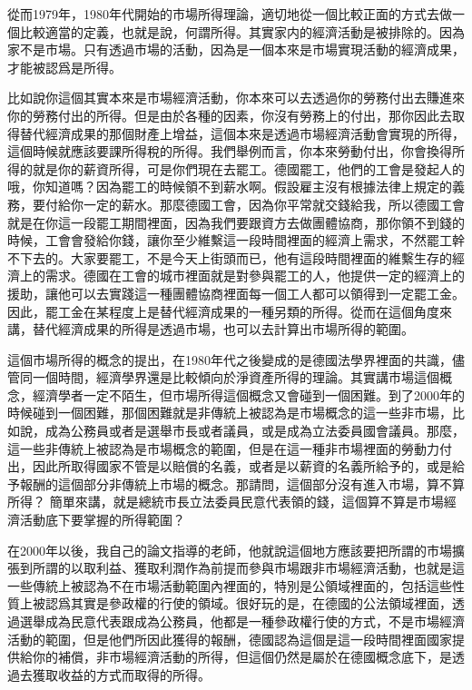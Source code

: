 \documentclass[oneside,sub3section]{ctexbook}
\begin{document}
從而1979年，1980年代開始的市場所得理論，適切地從一個比較正面的方式去做一個比較適當的定義，也就是說，何謂所得。其實家内的經濟活動是被排除的。因為家不是市場。只有透過市場的活動，因為是一個本來是市場實現活動的經濟成果，才能被認爲是所得。

比如說你這個其實本來是市場經濟活動，你本來可以去透過你的勞務付出去賺進來你的勞務付出的所得。但是由於各種的因素，你沒有勞務上的付出，那你因此去取得替代經濟成果的那個財產上增益，這個本來是透過市場經濟活動會實現的所得，這個時候就應該要課所得稅的所得。我們舉例而言，你本來勞動付出，你會換得所得的就是你的薪資所得，可是你們現在去罷工。德國罷工，他們的工會是發起人的哦，你知道嗎？因為罷工的時候領不到薪水啊。假設雇主沒有根據法律上規定的義務，要付給你一定的薪水。那麼德國工會，因為你平常就交錢給我，所以德國工會就是在你這一段罷工期間裡面，因為我們要跟資方去做團體協商，那你領不到錢的時候，工會會發給你錢，讓你至少維繫這一段時間裡面的經濟上需求，不然罷工幹不下去的。大家要罷工，不是今天上街頭而已，他有這段時間裡面的維繫生存的經濟上的需求。德國在工會的城市裡面就是對參與罷工的人，他提供一定的經濟上的援助，讓他可以去實踐這一種團體協商裡面每一個工人都可以領得到一定罷工金。因此，罷工金在某程度上是替代經濟成果的一種另類的所得。從而在這個角度來講，替代經濟成果的所得是透過市場，也可以去計算出市場所得的範圍。

這個市場所得的概念的提出，在1980年代之後變成的是德國法學界裡面的共識，儘管同一個時間，經濟學界還是比較傾向於淨資產所得的理論。其實講市場這個概念，經濟學者一定不陌生，但市場所得這個概念又會碰到一個困難。到了2000年的時候碰到一個困難，那個困難就是非傳統上被認為是市場概念的這一些非市場，比如說，成為公務員或者是選舉市長或者議員，或是成為立法委員國會議員。那麼，這一些非傳統上被認為是市場概念的範圍，但是在這一種非市場裡面的勞動力付出，因此所取得國家不管是以賠償的名義，或者是以薪資的名義所給予的，或是給予報酬的這個部分非傳統上市場的概念。那請問，這個部分沒有進入市場，算不算所得？ 簡單來講，就是總統市長立法委員民意代表領的錢，這個算不算是市場經濟活動底下要掌握的所得範圍？

在2000年以後，我自己的論文指導的老師，他就說這個地方應該要把所謂的市場擴張到所謂的以取利益、獲取利潤作為前提而參與市場跟非市場經濟活動，也就是這一些傳統上被認為不在市場活動範圍內裡面的，特別是公領域裡面的，包括這些性質上被認爲其實是參政權的行使的領域。很好玩的是，在德國的公法領域裡面，透過選舉成為民意代表跟成為公務員，他都是一種參政權行使的方式，不是市場經濟活動的範圍，但是他們所因此獲得的報酬，德國認為這個是這一段時間裡面國家提供給你的補償，非市場經濟活動的所得，但這個仍然是屬於在德國概念底下，是透過去獲取收益的方式而取得的所得。
\end{document}
